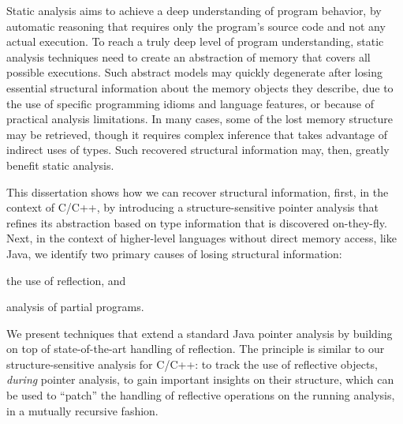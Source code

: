 
Static analysis aims to achieve a deep understanding of program
behavior, by automatic reasoning that requires only the program's
source code and not any actual execution. To reach a truly deep level
of program understanding, static analysis techniques need to create an
abstraction of memory that covers all possible executions. Such
abstract models may quickly degenerate after losing essential
structural information about the memory objects they describe, due to
the use of specific programming idioms and language features, or
because of practical analysis limitations. In many cases, some of the
lost memory structure may be retrieved, though it requires complex
inference that takes advantage of indirect uses of types. Such
recovered structural information may, then, greatly benefit static
analysis.

This dissertation shows how we can recover structural information,
first, in the context of C/C++, by introducing a structure-sensitive
pointer analysis that refines its abstraction based on type
information that is discovered on-they-fly. Next, in the context of
higher-level languages without direct memory access, like Java, we
identify two primary causes of losing structural information:
\begin{inparaenum}[(i)]
\item the use of reflection, and
\item analysis of partial programs.
\end{inparaenum}
We present techniques that extend a standard Java pointer analysis by
building on top of state-of-the-art handling of reflection. The
principle is similar to our structure-sensitive analysis for C/C++: to
track the use of reflective objects, \emph{during} pointer analysis,
to gain important insights on their structure, which can be used to
``patch'' the handling of reflective operations on the running
analysis, in a mutually recursive fashion.

